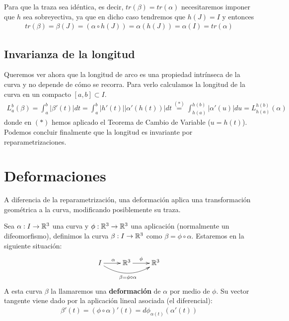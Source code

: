\begin{observacion}
    Para que la traza sea idéntica, es decir, $tr(\beta) = tr(\alpha)$ necesitaremos imponer que $h$ sea sobreyectiva, ya que en dicho caso tendremos que $h(J)=I$ y entonces
    \begin{gather*}
        tr(\beta) = \beta(J) = (\alpha\circ h (J)) = \alpha(h(J)) = \alpha(I) = tr(\alpha)
    \end{gather*}
\end{observacion}

\subsection{Invarianza de la longitud}

Queremos ver ahora que la longitud de arco es una propiedad intrínseca de la curva y no depende de cómo se recorra. Para verlo calculamos la longitud de la curva en un compacto $[a,b]\subset I$.
\begin{gather*}
    L_a^b(\beta) = \int_a^b|\beta'(t)| dt = \int_a^b |h'(t)||\alpha'(h(t))| dt \overset{(\ast)}{=} \int_{h(a)}^{h(b)} |\alpha'(u)| du = L_{h(a)}^{h(b)}(\alpha)
\end{gather*}
donde en $(\ast)$ hemos aplicado el Teorema de Cambio de Variable ($u=h(t)$). Podemos concluir finalmente que la longitud es invariante por reparametrizaciones.

\section{Deformaciones}

A diferencia de la reparametrización, una deformación aplica una transformación geométrica a la curva, modificando posiblemente su traza.

\begin{definicion}
    Sea $\alpha: I \to \mathbb{R}^3$ una curva y $\phi:\mathbb{R}^3 \to \mathbb{R}^3$ una aplicación (normalmente un difeomorfismo), definimos la curva $\beta:I \to \mathbb{R}^3$ como $\beta = \phi \circ \alpha$. Estaremos en la siguiente situación:
    \begin{gather*}
        \xymatrix{
            I \ar[r]^{\alpha} \ar@/_{5mm}/[rr]_{\beta=\phi\circ \alpha} & \bb{R}^3 \ar[r]^{\phi} & \bb{R}^3
        }
    \end{gather*}
    A esta curva $\beta$ la llamaremos una \textbf{deformación} de $\alpha$ por medio de $\phi$. Su vector tangente viene dado por la aplicación lineal asociada (el diferencial):
    \begin{gather*}
        \beta'(t) = (\phi \circ \alpha)'(t) = d\phi_{\alpha(t)}(\alpha'(t))
    \end{gather*}
\end{definicion}

